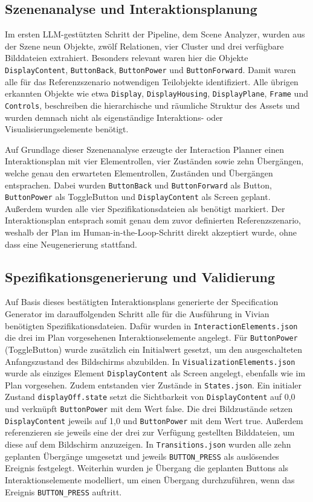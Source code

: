 \subsection{Szenenanalyse und Interaktionsplanung}

Im ersten LLM-gestützten Schritt der Pipeline, dem Scene Analyzer, wurden aus der Szene neun Objekte, zwölf Relationen, vier Cluster und drei verfügbare Bilddateien extrahiert. Besonders relevant waren hier die Objekte \texttt{DisplayContent}, \texttt{ButtonBack}, \texttt{ButtonPower} und \texttt{ButtonForward}. Damit waren alle für das Referenzszenario notwendigen Teilobjekte identifiziert. Alle übrigen erkannten Objekte wie etwa \texttt{Display}, \texttt{DisplayHousing}, \texttt{DisplayPlane}, \texttt{Frame} und \texttt{Controls}, beschreiben die hierarchische und räumliche Struktur des Assets und wurden demnach nicht als eigenständige Interaktions- oder Visualisierungselemente benötigt.

Auf Grundlage dieser Szenenanalyse erzeugte der Interaction Planner einen Interaktionsplan mit vier Elementrollen, vier Zuständen sowie zehn Übergängen, welche genau den erwarteten Elementrollen, Zuständen und Übergängen entsprachen. Dabei wurden \texttt{ButtonBack} und \texttt{ButtonForward} als Button, \texttt{ButtonPower} als ToggleButton und \texttt{DisplayContent} als Screen geplant. Außerdem wurden alle vier Spezifikationsdateien als benötigt markiert. Der Interaktionsplan entsprach somit genau dem zuvor definierten Referenzszenario, weshalb der Plan im Human-in-the-Loop-Schritt direkt akzeptiert wurde, ohne dass eine Neugenerierung stattfand.

\subsection{Spezifikationsgenerierung und Validierung}

Auf Basis dieses bestätigten Interaktionsplans generierte der Specification Generator im darauffolgenden Schritt alle für die Ausführung in Vivian benötigten Spezifikationsdateien. Dafür wurden in \texttt{InteractionElements.json} die drei im Plan vorgesehenen Interaktionselemente angelegt. Für \texttt{ButtonPower} (ToggleButton) wurde zusätzlich ein Initialwert gesetzt, um den ausgeschalteten Anfangszustand des Bildschirms abzubilden. In \texttt{VisualizationElements.json} wurde als einziges Element \texttt{DisplayContent} als Screen angelegt, ebenfalls wie im Plan vorgesehen. Zudem entstanden vier Zustände in \texttt{States.json}. Ein initialer Zustand \texttt{displayOff.state} setzt die Sichtbarkeit von \texttt{DisplayContent} auf 0,0 und verknüpft \texttt{ButtonPower} mit dem Wert false. Die drei Bildzustände setzen \texttt{DisplayContent} jeweils auf 1,0 und \texttt{ButtonPower} mit dem Wert true. Außerdem referenzieren sie jeweils eine der drei zur Verfügung gestellten Bilddateien, um diese auf dem Bildschirm anzuzeigen. In \texttt{Transitions.json} wurden alle zehn geplanten Übergänge umgesetzt und jeweils \texttt{BUTTON\_PRESS} als auslösendes Ereignis festgelegt. Weiterhin wurden je Übergang die geplanten Buttons als Interaktionselemente modelliert, um einen Übergang durchzuführen, wenn das Ereignis \texttt{BUTTON\_PRESS} auftritt.

